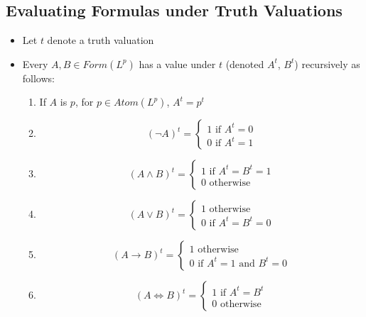\documentclass[11pt]{article}
\begin{document}
\subsection{Evaluating Formulas under Truth Valuations}
\begin{itemize}
    \item Let $t$ denote a truth valuation 
    \item Every $A,B\in Form(L^p)$ has a value under $t$ (denoted $A^t$, $B^t$) recursively as follows: 
    \begin{enumerate}
        \item If $A$ is $p$, for $p\in Atom(L^p)$, $A^t = p^t$
        \item 
        \begin{equation*}
            (\neg A)^t =
            \begin{cases}
                1 \text{ if } A^t = 0 \\
                0 \text{ if } A^t = 1
            \end{cases}
        \end{equation*}
        \item 
        \begin{equation*}
            (A\land B)^t =
            \begin{cases}
                1 \text{ if } A^t = B^t = 1 \\
                0 \text{ otherwise }
            \end{cases}
        \end{equation*}
        \item 
        \begin{equation*}
            (A\lor B)^t =
            \begin{cases}
                1 \text{ otherwise }  \\
                0 \text{ if } A^t = B^t = 0
            \end{cases}
        \end{equation*}
        \item 
        \begin{equation*}
            (A\rightarrow B)^t =
            \begin{cases}
                1 \text{ otherwise } \\
                0 \text{ if } A^t = 1 \text{ and } B^t = 0
            \end{cases}
        \end{equation*}
        \item 
        \begin{equation*}
            (A\iff B)^t =
            \begin{cases}
                1 \text{ if } A^t = B^t \\
                0 \text{ otherwise }
            \end{cases}
        \end{equation*}
    \end{enumerate}
\end{itemize}
\end{document}
